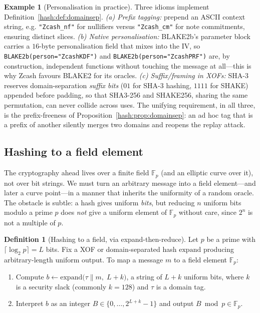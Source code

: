 \documentclass[11pt,a4paper]{article}
\theoremstyle{definition}
\newtheorem{definition}[theorem]{Definition}
\newtheorem{example}[theorem]{Example}
\theoremstyle{remark}
\newcommand{\Fp}{\ensuremath{\mathbb{F}_{p}}}
\begin{document}
\begin{example}[Personalisation in practice]\label{hash:ex:personalisation}
Three idioms implement Definition~\ref{hash:def:domainsep}. \emph{(a) Prefix tagging:} prepend an ASCII context string, e.g. \texttt{"Zcash\_nf"} for nullifiers versus \texttt{"Zcash\_cm"} for note commitments, ensuring distinct slices. \emph{(b) Native personalisation:} BLAKE2b's parameter block carries a \(16\)-byte personalisation field that mixes into the IV, so \texttt{BLAKE2b(person="ZcashKDF")} and \texttt{BLAKE2b(person="ZcashPRF")} are, by construction, independent functions without touching the message at all---this is why Zcash favours BLAKE2 for its oracles. \emph{(c) Suffix/framing in XOFs:} SHA-3 reserves domain-separation \emph{suffix bits} (\(01\) for SHA-3 hashing, \(1111\) for SHAKE) appended before padding, so that SHA3-256 and SHAKE256, sharing the same permutation, can never collide across uses. The unifying requirement, in all three, is the prefix-freeness of Proposition~\ref{hash:prop:domainsep}: an ad hoc tag that is a prefix of another silently merges two domains and reopens the replay attack.
\end{example}

\subsection{Hashing to a field element}\label{hash:sub:tofield}

The cryptography ahead lives over a finite field \(\Fp\) (and an elliptic curve over it), not over bit strings. We must turn an arbitrary message into a field element---and later a curve point---in a manner that inherits the uniformity of a random oracle. The obstacle is subtle: a hash gives uniform \emph{bits}, but reducing \(n\) uniform bits modulo a prime \(p\) does \emph{not} give a uniform element of \(\Fp\) without care, since \(2^{n}\) is not a multiple of \(p\).

\begin{definition}[Hashing to a field, via expand-then-reduce]\label{hash:def:tofield}
Let \(p\) be a prime with \(\lceil \log_{2} p \rceil = L\) bits. Fix a XOF or domain-separated hash \(\mathrm{expand}\) producing arbitrary-length uniform output. To map a message \(m\) to a field element \(\Fp\):
\begin{enumerate}
  \item Compute \(b \leftarrow \mathrm{expand}\bigl(\tau \mathbin{\|} m,\; L + k\bigr)\), a string of \(L + k\) uniform bits, where \(k\) is a security slack (commonly \(k = 128\)) and \(\tau\) is a domain tag.
  \item Interpret \(b\) as an integer \(B \in \{0,\dots,2^{L+k}-1\}\) and output \(B \bmod p \in \Fp\).
\end{enumerate}
\end{definition}
\end{document}
